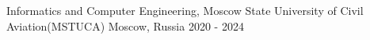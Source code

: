 

\cventryeducation
{Informatics and Computer Engineering,} %
{Moscow State University of Civil Aviation(MSTUCA)} %
{Moscow, Russia} %
{2020 - 2024} %